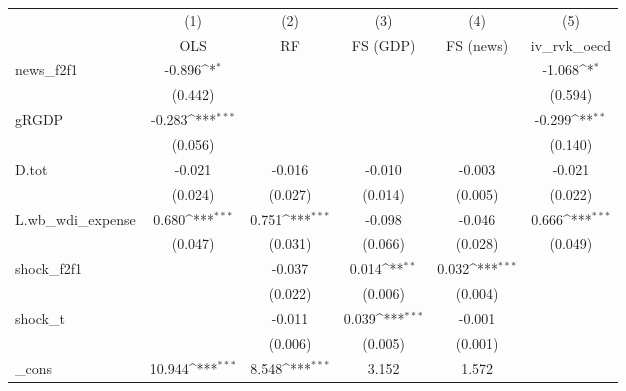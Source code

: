 {
\def\sym#1{\ifmmode^{#1}\else\(^{#1}\)\fi}
\begin{tabular}{l*{5}{c}}
\toprule
            &\multicolumn{1}{c}{(1)}&\multicolumn{1}{c}{(2)}&\multicolumn{1}{c}{(3)}&\multicolumn{1}{c}{(4)}&\multicolumn{1}{c}{(5)}\\
            &\multicolumn{1}{c}{OLS}&\multicolumn{1}{c}{RF}&\multicolumn{1}{c}{FS (GDP)}&\multicolumn{1}{c}{FS (news)}&\multicolumn{1}{c}{iv\_rvk\_oecd}\\
\midrule
news\_f2f1   &      -0.896\sym{*}  &                     &                     &                     &      -1.068\sym{*}  \\
            &     (0.442)         &                     &                     &                     &     (0.594)         \\
\addlinespace
gRGDP       &      -0.283\sym{***}&                     &                     &                     &      -0.299\sym{**} \\
            &     (0.056)         &                     &                     &                     &     (0.140)         \\
\addlinespace
D.tot       &      -0.021         &      -0.016         &      -0.010         &      -0.003         &      -0.021         \\
            &     (0.024)         &     (0.027)         &     (0.014)         &     (0.005)         &     (0.022)         \\
\addlinespace
L.wb\_wdi\_expense&       0.680\sym{***}&       0.751\sym{***}&      -0.098         &      -0.046         &       0.666\sym{***}\\
            &     (0.047)         &     (0.031)         &     (0.066)         &     (0.028)         &     (0.049)         \\
\addlinespace
shock\_f2f1  &                     &      -0.037         &       0.014\sym{**} &       0.032\sym{***}&                     \\
            &                     &     (0.022)         &     (0.006)         &     (0.004)         &                     \\
\addlinespace
shock\_t     &                     &      -0.011         &       0.039\sym{***}&      -0.001         &                     \\
            &                     &     (0.006)         &     (0.005)         &     (0.001)         &                     \\
\addlinespace
\_cons      &      10.944\sym{***}&       8.548\sym{***}&       3.152         &       1.572         &                     \\

\end{tabular}}
